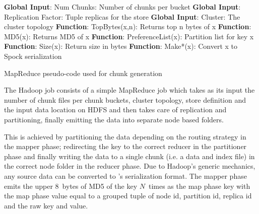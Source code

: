 \begin{algorithm}[!t]
\scriptsize
\DontPrintSemicolon
{}

{\bf Global Input}: Num Chunks: Number of chunks per bucket\;
{\bf Global Input}: Replication Factor: Tuple replicas for the store\;
{\bf Global Input}: Cluster: The cluster topology\;
{\bf Function}: TopBytes(x,n): Returns top n bytes of x\;
{\bf Function}: MD5(x): Returns MD5 of x\;
{\bf Function}: PreferenceList(x): Partition list for key x\;
{\bf Function}: Size(x): Return size in bytes\;
{\bf Function}: Make*(x): Convert x to Spock serialization\;

\BlankLine
\BlankLine
{}

\BlankLine
{}


\BlankLine
{} 
\BlankLine
\caption{MapReduce pseudo-code used for chunk generation}
\label{fig:mapreduce-chunk-generation}
\end{algorithm}

The Hadoop job consists of a simple MapReduce job which takes as its
input the number of chunk files per chunk buckets, cluster topology, 
store definition and the input data location on HDFS and then 
takes care of replication and partitioning, finally emitting the 
data into separate node based folders. 

This is achieved by partitioning the data depending on the routing
strategy in the mapper phase; redirecting the key to the correct reducer 
in the partitioner phase and finally writing the data to a single
chunk (i.e. a data and index file) in the correct node folder in the
reducer phase. Due to Hadoop's generic  mechanics, any source data
can be converted to \projectname{}'s serialization format. The mapper
phase emits the upper 8~bytes of MD5 of the \projectname{} key
$N$~times as the map phase key with the map phase value equal to a
grouped tuple of node id, partition id, replica id and the raw
\projectname{} key and value. 


